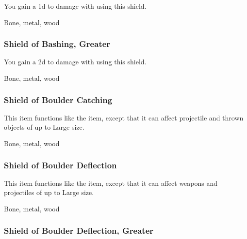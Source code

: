 You gain a \plus1d  to damage with  using this shield.



 Bone, metal, wood


\lowercase{\hypertarget{item:Shield of Bashing, Greater}{}}\label{item:Shield of Bashing, Greater}
\hypertarget{item:Shield of Bashing, Greater}{\subsubsection{Shield of Bashing, Greater\hfill{}}}

You gain a \plus2d  to damage with  using this shield.



 Bone, metal, wood


\lowercase{\hypertarget{item:Shield of Boulder Catching}{}}\label{item:Shield of Boulder Catching}
\hypertarget{item:Shield of Boulder Catching}{\subsubsection{Shield of Boulder Catching\hfill{}}}

This item functions like the  item, except that it can affect projectile and thrown objects of up to Large size.



 Bone, metal, wood


\lowercase{\hypertarget{item:Shield of Boulder Deflection}{}}\label{item:Shield of Boulder Deflection}
\hypertarget{item:Shield of Boulder Deflection}{\subsubsection{Shield of Boulder Deflection\hfill{}}}

This item functions like the  item, except that it can affect weapons and projectiles of up to Large size.



 Bone, metal, wood


\lowercase{\hypertarget{item:Shield of Boulder Deflection, Greater}{}}\label{item:Shield of Boulder Deflection, Greater}
\hypertarget{item:Shield of Boulder Deflection, Greater}{\subsubsection{Shield of Boulder Deflection, Greater\hfill{}}}

